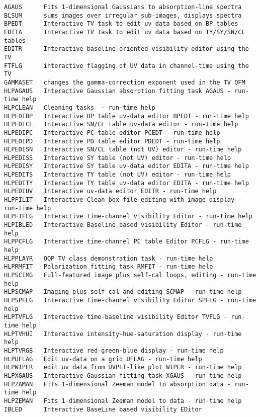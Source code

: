 \vskip 0.5pt
\bbve\begin{verbatim}
AGAUS      Fits 1-dimensional Gaussians to absorption-line spectra
BLSUM      sums images over irregular sub-images, displays spectra
BPEDT      Interactive TV task to edit uv data based on BP tables
EDITA      Interactive TV task to edit uv data based on TY/SY/SN/CL tables
EDITR      Interactive baseline-oriented visibility editor using the TV
FTFLG      interactive flagging of UV data in channel-time using the TV
GAMMASET   changes the gamma-correction exponent used in the TV OFM
HLPAGAUS   Interactive Gaussian absorption fitting task AGAUS - run-time help
HLPCLEAN   Cleaning tasks  - run-time help
HLPEDIBP   Interactive BP table uv-data editor BPEDT - run-time help
HLPEDICL   Interactive SN/CL table uv-data editor - run-time help
HLPEDIPC   Interactive PC table editor PCEDT - run-time help
HLPEDIPD   Interactive PD table editor PDEDT - run-time help
HLPEDISN   Interactive SN/CL table (not UV) editor - run-time help
HLPEDISS   Interactive SY table (not UV) editor - run-time help
HLPEDISY   Interactive SY table uv-data editor EDITA - run-time help
HLPEDITS   Interactive TY table (not UV) editor - run-time help
HLPEDITY   Interactive TY table uv-data editor EDITA - run-time help
HLPEDIUV   Interactive uv-data editor EDITR - run-time help
HLPFILIT   Interactive Clean box file editing with image display - run-time help
HLPFTFLG   Interactive time-channel visibility Editor - run-time help
HLPIBLED   Interactive Baseline based visibility Editor - run-time help
HLPPCFLG   Interactive time-channel PC table Editor PCFLG - run-time help
HLPPLAYR   OOP TV class demonstration task - run-time help
HLPRMFIT   Polarization fitting task RMFIT - run-time help
HLPSCIMG   Full-featured image plus self-cal loops, editing - run-time help
HLPSCMAP   Imaging plus self-cal and editing SCMAP - run-time help
HLPSPFLG   Interactive time-channel visibility Editor SPFLG - run-time help
HLPTVFLG   Interactive time-baseline visibility Editor TVFLG - run-time help
HLPTVHUI   Interactive intensity-hue-saturation display - run-time help
HLPTVRGB   Interactive red-green-blue display - run-time help
HLPUFLAG   Edit uv-data on a grid UFLAG - run-time help
HLPWIPER   edit uv data from UVPLT-like plot WIPER - run-time help
HLPXGAUS   Interactive Gaussian fitting task XGAUS - run-time help
HLPZAMAN   Fits 1-dimensional Zeeman model to absorption data - run-time help
HLPZEMAN   Fits 1-dimensional Zeeman model to data - run-time help
IBLED      Interactive BaseLine based visibility EDitor

\end{verbatim}

